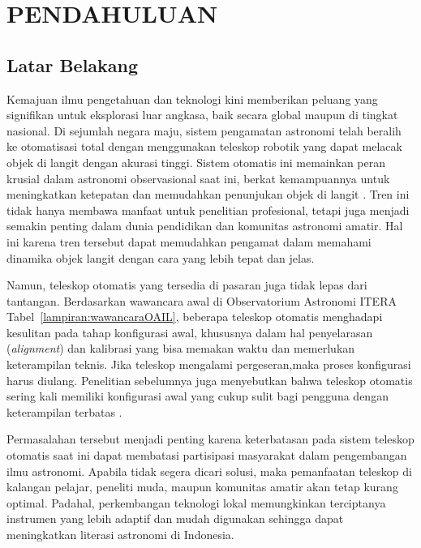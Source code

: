 \cleardoublepage
\chapter{PENDAHULUAN} \label{Bab I}

\section{Latar Belakang} \label{I.Latar Belakang}

Kemajuan ilmu pengetahuan dan teknologi kini memberikan peluang yang signifikan untuk eksplorasi luar angkasa, baik secara global maupun di tingkat nasional. Di sejumlah negara maju, sistem pengamatan astronomi telah beralih ke otomatisasi total dengan menggunakan teleskop robotik yang dapat melacak objek di langit dengan akurasi tinggi. Sistem otomatis ini memainkan peran krusial dalam astronomi observasional saat ini, berkat kemampuannya untuk meningkatkan ketepatan dan memudahkan penunjukan objek di langit \cite{Hadi2022}. Tren ini tidak hanya membawa manfaat untuk penelitian profesional, tetapi juga menjadi semakin penting dalam dunia pendidikan dan komunitas astronomi amatir. Hal ini karena tren tersebut dapat memudahkan pengamat dalam memahami dinamika objek langit dengan cara yang lebih tepat dan jelas.  

Namun, teleskop otomatis yang tersedia di pasaran juga tidak lepas dari tantangan. Berdasarkan wawancara awal di Observatorium Astronomi ITERA Tabel~\ref{lampiran:wawancaraOAIL}, beberapa teleskop otomatis menghadapi kesulitan pada tahap konfigurasi awal, khususnya dalam hal penyelarasan (\textit{alignment}) dan kalibrasi yang bisa memakan waktu dan memerlukan keterampilan teknis. Jika teleskop mengalami pergeseran,maka proses konfigurasi harus diulang. Penelitian sebelumnya juga menyebutkan bahwa teleskop otomatis sering kali memiliki konfigurasi awal yang cukup sulit bagi pengguna dengan keterampilan terbatas \cite{Dyer2020} \cite{Rangana2022}.

Permasalahan tersebut menjadi penting karena keterbatasan pada sistem teleskop otomatis saat ini dapat membatasi partisipasi masyarakat dalam pengembangan ilmu astronomi. Apabila tidak segera dicari solusi, maka pemanfaatan teleskop di kalangan pelajar, peneliti muda, maupun komunitas amatir akan tetap kurang optimal. Padahal, perkembangan teknologi lokal memungkinkan terciptanya instrumen yang lebih adaptif dan mudah digunakan sehingga dapat meningkatkan literasi astronomi di Indonesia.

